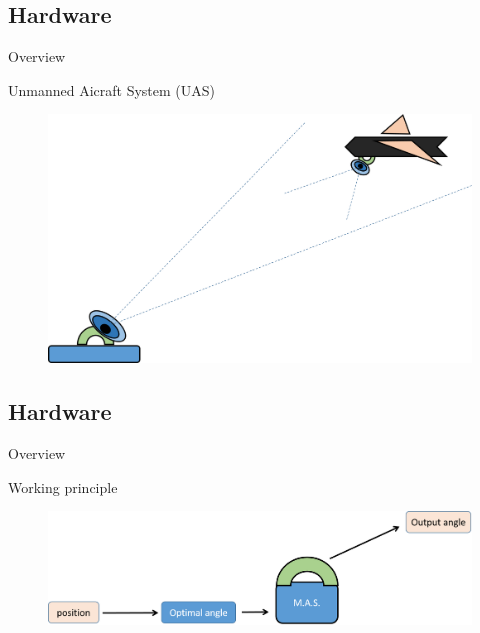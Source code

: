 \subsection{Hardware}

\begin{frame}{Overview}{}
  \begin{block}{Unmanned Aicraft System (UAS)}
    
   \begin{figure}[H]
\centerline{
\includegraphics[scale=0.35]{figures/overview.png}}
\label{fig:overview}
\end{figure}

    
  \end{block}
\end{frame}

\subsection{Hardware}

\begin{frame}{Overview}{}
  \begin{block}{Working principle}
    
   \begin{figure}[H]
\centerline{
\includegraphics[scale=0.35]{figures/overview2.png}}
\label{fig:overview}
\end{figure}

    
  \end{block}
\end{frame}

